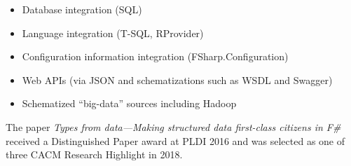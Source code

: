 \documentclass[acmsmall,screen]{acmart}
\begin{document}
\begin{itemize}
\item Database integration (SQL)
\item Language integration (T-SQL, RProvider)
\item Configuration information integration (FSharp.Configuration)
\item Web APIs (via JSON and schematizations such as WSDL and Swagger)
\item Schematized “big-data” sources including Hadoop
\end{itemize}

The paper \textit{Types from data---Making structured data first-class citizens in F\#} \citep{Petricek2016} received a Distinguished Paper award at PLDI 2016 and was selected as one of three CACM Research Highlight in 2018.
\end{document}
